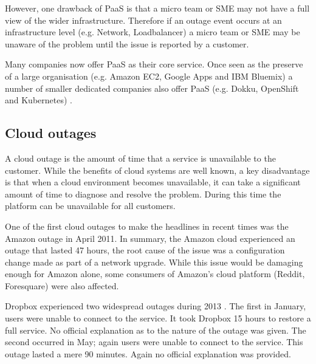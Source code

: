 However, one drawback of PaaS is that a micro team or SME may not have a full view of the wider infrastructure. Therefore if an outage event occurs at an infrastructure level (e.g. Network, Loadbalancer) a micro team or SME may be unaware of the problem until the issue is reported by a customer.

Many companies now offer PaaS as their core service. Once seen as the preserve of a large organisation (e.g. Amazon EC2, Google Apps and IBM Bluemix) a number of smaller dedicated companies also offer PaaS (e.g. Dokku, OpenShift and Kubernetes) \cite{Paas2016}.


\subsection{Cloud outages}
A cloud outage is the amount of time that a service is unavailable to the customer. While the benefits of cloud systems are well known, a key disadvantage is that when a cloud environment becomes unavailable, it can take a significant amount of time to diagnose and resolve the problem. During this time the platform can be unavailable for all customers. \par

One of the first cloud outages to make the headlines in recent times was the Amazon outage in April 2011. In summary, the Amazon cloud experienced an outage that lasted 47 hours, the root cause of the issue was a configuration change made as part of a network upgrade. While this issue would be damaging enough for Amazon alone, some consumers of Amazon's cloud platform (Reddit, Foresquare) were also affected. \cite{InfoWorld2015outage} \par

Dropbox experienced two widespread outages during 2013 \cite{Talbot013DBoutage, Etherington2013DBoutage}. The first in January, users were unable to connect to the service. It took Dropbox 15 hours to restore a full service. No official explanation as to the nature of the outage was given. The second occurred in May; again users were unable to connect to the service. This outage lasted a mere 90 minutes. Again no official explanation was provided.

